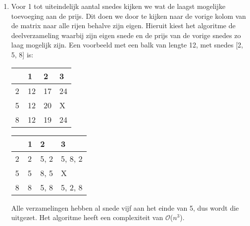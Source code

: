 \documentclass[11pt]{article}
\newcommand{\bigO}{\ensuremath{\mathcal{O}}}
\begin{document}
\begin{enumerate}
\begin{enumerate}
            \item
                Voor 1 tot uiteindelijk aantal snedes kijken we wat de
                laagst mogelijke toevoeging aan de prijs. Dit doen we door te
                kijken naar de vorige kolom van de matrix naar alle rijen
                behalve zijn eigen.
                \pagebreak 
                Hieruit kiest het algoritme de
                deelverzameling waarbij zijn eigen snede en de prijs van de vorige snedes zo laag mogelijk zijn. Een voorbeeld met een
                balk van lengte 12, met snedes [2, 5, 8] is:

                \begin{table}[H]
                \centering
                    \begin{tabular}{l|lll}
                    ~ & 1  & 2  & 3  \\ \hline
                    2 & 12 & 17 & 24 \\
                    5 & 12 & 20 & X  \\
                    8 & 12 & 19 & 24 \\
                    \end{tabular}
                \end{table}
                \begin{table}[H]
                \centering
                    \begin{tabular}{l|lll}
                    ~ & 1 & 2    & 3        \\ \hline
                    2 & 2 & 5, 2 & 5, 8, 2  \\
                    5 & 5 & 8, 5 & X        \\
                    8 & 8 & 5, 8 & 5, 2, 8  \\
                    \end{tabular}
                \end{table}

                Alle verzamelingen hebben al snede vijf aan het einde van 5,
                dus wordt die uitgezet. Het algoritme heeft een complexiteit van \bigO($n^3$).
        \end{enumerate}


\end{enumerate}
\end{document}
